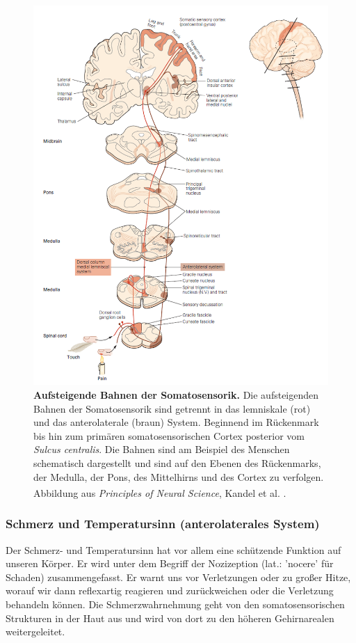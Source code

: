 \documentclass[12pt,a4paper,pdftex]{article}
\begin{document}
\begin{figure}[H]
    \centering
    \includegraphics{pictures/somatosensory/pathway_somatosensory2.png}
    \caption[Aufsteigende Bahnen der Somatosensorik]{\textbf{Aufsteigende Bahnen der Somatosensorik.} Die aufsteigenden Bahnen der Somatosensorik sind getrennt in das lemniskale (rot) und das anterolaterale (braun) System. Beginnend im Rückenmark bis hin zum primären somatosensorischen Cortex posterior vom \textit{Sulcus centralis}. Die Bahnen sind am Beispiel des Menschen schematisch dargestellt und sind auf den Ebenen des Rückenmarks, der Medulla, der Pons, des Mittelhirns und des Cortex zu verfolgen.\\
    Abbildung aus \textit{Principles of Neural Science}, Kandel et al. \textsuperscript{\cite[22]{kandel2013principles}}.}
    \label{fig:somato_pathway}
\end{figure}

\newpage    
\subsubsection{Schmerz und Temperatursinn (anterolaterales System)}
\label{subsubsec:Schmerzsinn}
Der Schmerz- und Temperatursinn   hat vor allem eine schützende Funktion auf unseren Körper. Er wird unter dem Begriff der Nozizeption (lat.: 'nocere' für Schaden) zusammengefasst. Er warnt uns vor Verletzungen oder zu großer Hitze, worauf wir dann reflexartig reagieren und zurückweichen oder die Verletzung behandeln können. Die Schmerzwahrnehmung geht von den somatosensorischen Strukturen in der Haut aus und wird von dort zu den höheren Gehirnarealen weitergeleitet.
\end{document}
